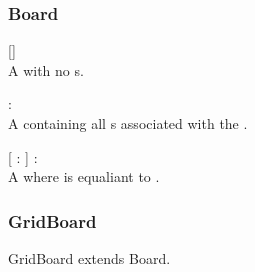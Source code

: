 \subsubsection{Board}
\begin{dlist}
  \item {}[]\\
  A  with no s.
  
  \item {} : \\
  A  containing all s associated with the .
  
  \item {}[  :  ] : \\
  A  where  is equaliant to .
\end{dlist}

\subsubsection{GridBoard}
GridBoard extends Board.

